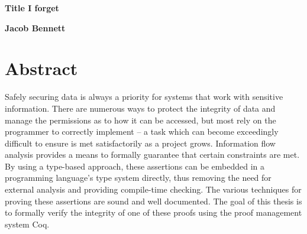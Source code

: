 \documentclass[12pt]{report}
\def\fCenter{{\mbox{\Large$\rightarrow$}}}
\begin{document}
\begin{titlepage}
\begin{center}

\begin{spacing}{1.5}
    \vspace*{\fill}
\end{spacing}

\begin{spacing}{2.5}
    \textbf{\Large Title  I forget}\\[0.5cm]
    \vspace*{\fill}
\end{spacing}

\begin{spacing}{1.15}
    \textbf{\large Jacob Bennett}
    \date{}
\end{spacing}

\end{center}
\end{titlepage}




\let\clearpage\relax

\setcounter{secnumdepth}{2}
\setcounter{tocdepth}{2}
\tableofcontents


\begin{coqdoccode}
\coqdocemptyline
\end{coqdoccode}
\chapter{Abstract}



 Safely securing data is always a priority for systems that work with
 sensitive information. There are numerous ways to protect the
 integrity of data and manage the permissions as to how it can be
 accessed, but most rely on the programmer to correctly implement
 – a task which can become exceedingly difficult to ensure is met
 satisfactorily as a project grows. Information flow analysis
 provides a means to formally guarantee that certain constraints are
 met. By using a type-based approach, these assertions can be
 embedded in a programming language's type system directly, thus
 removing the need for external analysis and providing compile-time
 checking. The various techniques for proving these assertions are
 sound and well documented. The goal of this thesis is to formally
 verify the integrity of one of these proofs using the proof
 management system Coq. 
\end{document}
